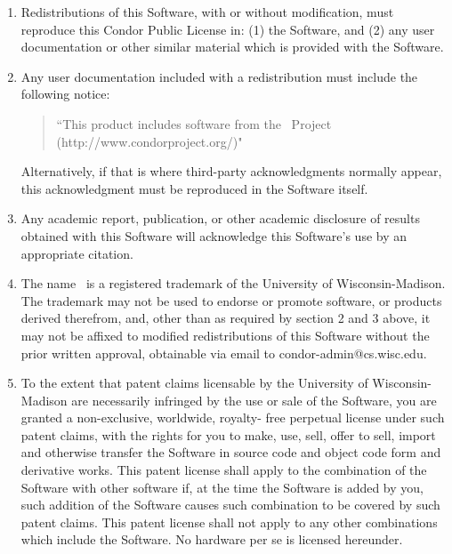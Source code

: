 \begin{enumerate}

\item Redistributions of this Software, with or without modification,
   must reproduce this Condor Public License in: (1) the Software,
   and (2) any user documentation or other similar material
   which is provided with the Software.

\item  Any user documentation included with a redistribution
   must include the following notice:

	\begin{quote}
       ``This product includes software from the \CondorR\ Project 
	   (http://www.condorproject.org/)"
	\end{quote}
   
   Alternatively, if that is where third-party acknowledgments
   normally appear, this acknowledgment must be reproduced in the
   Software itself.
   
\item Any academic report, publication, or other academic disclosure 
   of results obtained with this Software will acknowledge this
   Software's use by an appropriate citation.

\item The name \CondorR\ is a registered trademark of the University of
   Wisconsin-Madison.  The trademark may not be used to endorse or
   promote software, or products derived therefrom, and, other than
   as required by section 2 and 3 above, it may not be affixed to modified
   redistributions of this Software without the prior written
   approval, obtainable via email to condor-admin@cs.wisc.edu.

\item To the extent that patent claims licensable by the University of
   Wisconsin-Madison are necessarily infringed by the use or sale of
   the Software, you are granted a non-exclusive, worldwide, royalty-
   free perpetual license under such patent claims, with the rights
   for you to make, use, sell, offer to sell, import and otherwise
   transfer the Software in source code and object code form and
   derivative works.   This patent license shall apply to the
   combination of the Software with other software if, at the time
   the Software is added by you, such addition of the Software causes
   such combination to be covered by such patent claims. This patent
   license shall not apply to any other combinations which include
   the Software.  No hardware per se is licensed hereunder.


\end{enumerate}
